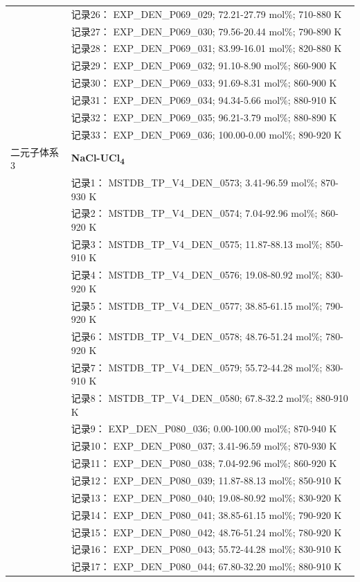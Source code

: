 \documentclass[12pt]{article}
\begin{document}
{\begin{longtable}[]{@{}
  >{\raggedright\arraybackslash}p{}
  >{\raggedright\arraybackslash}p{}@{}}
 & 记录26： EXP\_DEN\_P069\_029; 72.21-27.79 mol\%; 710-880 K \\
 & 记录27： EXP\_DEN\_P069\_030; 79.56-20.44 mol\%; 790-890 K \\
 & 记录28： EXP\_DEN\_P069\_031; 83.99-16.01 mol\%; 820-880 K \\
 & 记录29： EXP\_DEN\_P069\_032; 91.10-8.90 mol\%; 860-900 K \\
 & 记录30： EXP\_DEN\_P069\_033; 91.69-8.31 mol\%; 860-900 K \\
 & 记录31： EXP\_DEN\_P069\_034; 94.34-5.66 mol\%; 880-910 K \\
 & 记录32： EXP\_DEN\_P069\_035; 96.21-3.79 mol\%; 880-890 K \\
 & 记录33： EXP\_DEN\_P069\_036; 100.00-0.00 mol\%; 890-920 K  \\

二元子体系 3  & \textbf{NaCl-UCl\textsubscript{4}} \\
 & 记录1： MSTDB\_TP\_V4\_DEN\_0573; 3.41-96.59 mol\%; 870-930 K \\
 & 记录2： MSTDB\_TP\_V4\_DEN\_0574; 7.04-92.96 mol\%; 860-920 K \\
 & 记录3： MSTDB\_TP\_V4\_DEN\_0575; 11.87-88.13 mol\%; 850-910 K \\
 & 记录4： MSTDB\_TP\_V4\_DEN\_0576; 19.08-80.92 mol\%; 830-920 K \\
 & 记录5： MSTDB\_TP\_V4\_DEN\_0577; 38.85-61.15 mol\%; 790-920 K \\
 & 记录6： MSTDB\_TP\_V4\_DEN\_0578; 48.76-51.24 mol\%; 780-920 K \\
 & 记录7： MSTDB\_TP\_V4\_DEN\_0579; 55.72-44.28 mol\%; 830-910 K \\
 & 记录8： MSTDB\_TP\_V4\_DEN\_0580; 67.8-32.2 mol\%; 880-910 K \\
 & 记录9： EXP\_DEN\_P080\_036; 0.00-100.00 mol\%; 870-940 K \\
 & 记录10： EXP\_DEN\_P080\_037; 3.41-96.59 mol\%; 870-930 K \\
 & 记录11： EXP\_DEN\_P080\_038; 7.04-92.96 mol\%; 860-920 K \\
 & 记录12： EXP\_DEN\_P080\_039; 11.87-88.13 mol\%; 850-910 K \\
 & 记录13： EXP\_DEN\_P080\_040; 19.08-80.92 mol\%; 830-920 K \\
 & 记录14： EXP\_DEN\_P080\_041; 38.85-61.15 mol\%; 790-920 K \\
 & 记录15： EXP\_DEN\_P080\_042; 48.76-51.24 mol\%; 780-920 K \\
 & 记录16： EXP\_DEN\_P080\_043; 55.72-44.28 mol\%; 830-910 K \\
 & 记录17： EXP\_DEN\_P080\_044; 67.80-32.20 mol\%; 880-910 K  \\


\end{longtable}}
\end{document}
